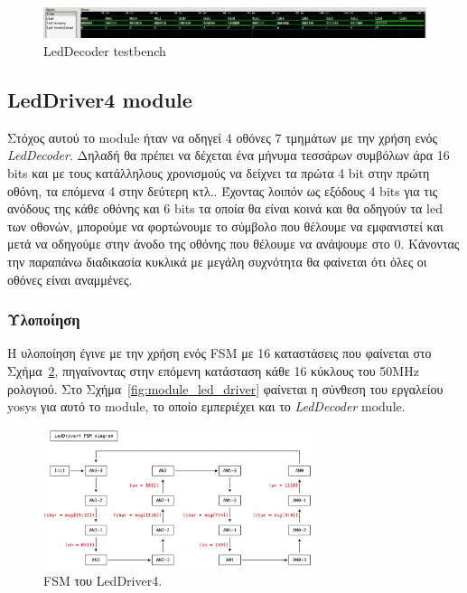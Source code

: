 \documentclass[../main.tex]{subfiles}
\begin{document}
\begin{figure}[H]
  \begin{center}
    \includegraphics[width=\textwidth]{../images/led_decoder_tb.png}
  \end{center}
  \caption{LedDecoder testbench}
  \label{fig:tb_led_decoder}
\end{figure}

\subsection{LedDriver4 module}

Στόχος αυτού το module ήταν να οδηγεί 4 οθόνες 7 τμημάτων με την χρήση ενός
\textit{LedDecoder}. Δηλαδή θα πρέπει να δέχεται ένα μήνυμα τεσσάρων συμβόλων
άρα 16 bits και με τους κατάλληλους χρονισμούς να δείχνει τα πρώτα 4 bit στην
πρώτη οθόνη, τα επόμενα 4 στην δεύτερη κτλ.. Έχοντας λοιπόν ως εξόδους 4 bits
για τις ανόδους της κάθε οθόνης και 6 bits τα οποία θα είναι κοινά και θα
οδηγούν τα led των οθονών, μπορούμε να φορτώνουμε το σύμβολο που θέλουμε να
εμφανιστεί και μετά να οδηγούμε στην άνοδο της οθόνης που θέλουμε να ανάψουμε
στο 0. Κάνοντας την παραπάνω διαδικασία κυκλικά με μεγάλη συχνότητα θα φαίνεται
ότι όλες οι οθόνες είναι αναμμένες.

\subsubsection*{Υλοποίηση}

Η υλοποίηση έγινε με την χρήση ενός FSM με 16 καταστάσεις που φαίνεται στο
Σχήμα~\ref{fig:fsm_led_driver}, πηγαίνοντας στην επόμενη κατάσταση κάθε 16
κύκλους του 50MHz ρολογιού. Στο Σχήμα~\ref{fig:module_led_driver} φαίνεται η
σύνθεση του εργαλείου yosys για αυτό το module, το οποίο εμπεριέχει και το
\textit{LedDecoder} module.

\begin{figure}[H]
  \begin{center}
    \includegraphics[width=0.7\textwidth]{../../monodraw/LedDriver4.png}
  \end{center}
  \caption{FSM του LedDriver4.}
  \label{fig:fsm_led_driver}
\end{figure}
\end{document}
